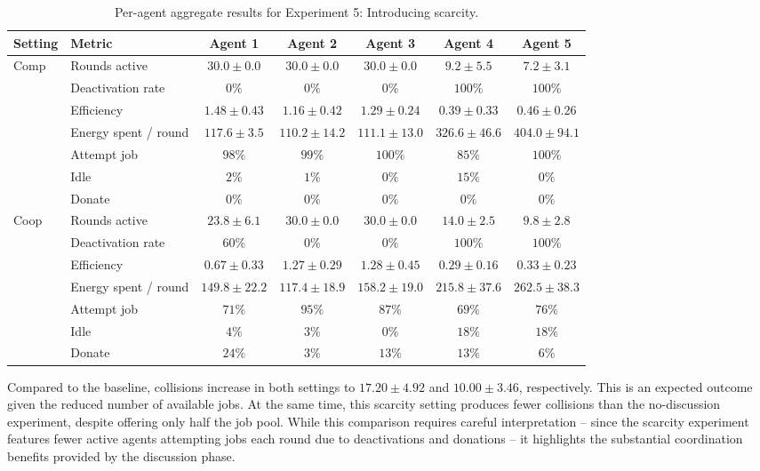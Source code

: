\documentclass[sigconf,nonacm]{acmart}
\begin{document}
\begin{table}[t]
\centering
\small
\setlength{\tabcolsep}{4pt}
\begin{tabular}{llccccc}
\toprule
Setting & Metric & Agent 1 & Agent 2 & Agent 3 & Agent 4 & Agent 5 \\
\midrule
\multirow{7}{*}{Comp}
& Rounds active
& $30.0 \pm 0.0$ & $30.0 \pm 0.0$ & $30.0 \pm 0.0$ & $9.2 \pm 5.5$ & $7.2 \pm 3.1$ \\
& Deactivation rate
& $0\%$ & $0\%$ & $0\%$ & $100\%$ & $100\%$ \\
& Efficiency
& $1.48 \pm 0.43$ & $1.16 \pm 0.42$ & $1.29 \pm 0.24$ & $0.39 \pm 0.33$ & $0.46 \pm 0.26$ \\
& Energy spent / round
& $117.6 \pm 3.5$ & $110.2 \pm 14.2$ & $111.1 \pm 13.0$ & $326.6 \pm 46.6$ & $404.0 \pm 94.1$ \\
& Attempt job
& $98\%$ & $99\%$ & $100\%$ & $85\%$ & $100\%$ \\
& Idle
& $2\%$ & $1\%$ & $0\%$ & $15\%$ & $0\%$ \\
& Donate
& $0\%$ & $0\%$ & $0\%$ & $0\%$ & $0\%$ \\
\midrule
\multirow{7}{*}{Coop}
& Rounds active
& $23.8 \pm 6.1$ & $30.0 \pm 0.0$ & $30.0 \pm 0.0$ & $14.0 \pm 2.5$ & $9.8 \pm 2.8$ \\
& Deactivation rate
& $60\%$ & $0\%$ & $0\%$ & $100\%$ & $100\%$ \\
& Efficiency
& $0.67 \pm 0.33$ & $1.27 \pm 0.29$ & $1.28 \pm 0.45$ & $0.29 \pm 0.16$ & $0.33 \pm 0.23$ \\
& Energy spent / round
& $149.8 \pm 22.2$ & $117.4 \pm 18.9$ & $158.2 \pm 19.0$ & $215.8 \pm 37.6$ & $262.5 \pm 38.3$ \\
& Attempt job
& $71\%$ & $95\%$ & $87\%$ & $69\%$ & $76\%$ \\
& Idle
& $4\%$ & $3\%$ & $0\%$ & $18\%$ & $18\%$ \\
& Donate
& $24\%$ & $3\%$ & $13\%$ & $13\%$ & $6\%$ \\
\bottomrule
\end{tabular}
\caption{Per-agent aggregate results for Experiment 5: Introducing scarcity.}
\label{tab:exp5_metrics_with_energy}
\end{table}

Compared to the baseline, collisions increase in both settings to \(17.20\pm4.92\) and \(10.00\pm3.46\), respectively. This is an expected outcome given the reduced number of available jobs.
At the same time, this scarcity setting produces fewer collisions than the no-discussion experiment, despite offering only half the job pool. 
While this comparison requires careful interpretation -- since the scarcity experiment features fewer active agents attempting jobs each round due to deactivations and donations -- it highlights the substantial coordination benefits provided by the discussion phase.
\end{document}
